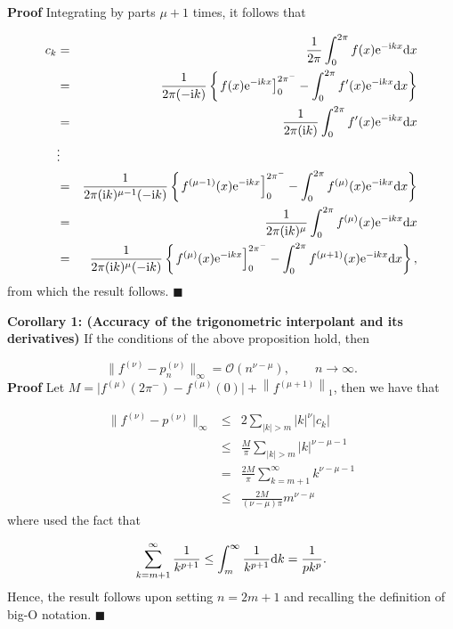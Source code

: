 \documentclass[12pt,landscape]{article}
\begin{document}
{\textbf{Proof} Integrating by parts $\mu+1$ times, it follows that


\begin{eqnarray*}
c_k &=& \frac{1}{2\pi}\int_{0}^{2\pi}f(x) {\rm e}^{-{\rm i}kx}{\rm d}x  \\
    &=& \frac{1}{2\pi(-{\rm i}k)}\left\lbrace \left.  f(x) {\rm e}^{-{\rm i}kx}\right]_{0}^{2\pi^{-}}  - \int_{0}^{2\pi}f'(x) {\rm e}^{-{\rm i}kx} {\rm d}x \right\rbrace \\
    &=& \frac{1}{2\pi({\rm i}k)} \int_{0}^{2\pi}f'(x) {\rm e}^{-{\rm i}kx} {\rm d}x \\
    &\vdots &   \\
    & = &  \frac{1}{2\pi({\rm i}k)^{\mu-1}(-{\rm i}k)}\left\lbrace \left.  f^{(\mu-1)}(x) {\rm e}^{-{\rm i}kx}\right]_{0}^{2\pi^{-}}  - \int_{0}^{2\pi}f^{(\mu)}(x) {\rm e}^{-{\rm i}kx} {\rm d}x \right\rbrace \\
    &=& \frac{1}{2\pi({\rm i}k)^{\mu}} \int_{0}^{2\pi}f^{(\mu)}(x) {\rm e}^{-{\rm i}kx} {\rm d}x \\
    &=& \frac{1}{2\pi({\rm i}k)^{\mu}(-{\rm i}k)}\left\lbrace \left.  f^{(\mu)}(x) {\rm e}^{-{\rm i}kx}\right]_{0}^{2\pi^{-}}  - \int_{0}^{2\pi}f^{(\mu+1)}(x) {\rm e}^{-{\rm i}kx} {\rm d}x \right\rbrace,
    \end{eqnarray*}
from which the result follows. $\blacksquare$

\textbf{Corollary 1: (Accuracy of the trigonometric interpolant and its derivatives)}  If the conditions of the above proposition hold, then

\[
\| f^{(\nu)} - p_n^{(\nu)} \|_{\infty} = \mathcal{O}(n^{\nu-\mu}), \qquad n \to \infty.
\]
\textbf{Proof} Let $M  = \vert f^{(\mu)}(2\pi^{-}) - f^{(\mu)}(0)   \vert + \left\|f^{(\mu+1)}   \right\|_1$, then we have that


\begin{eqnarray*}
\| f^{(\nu)} - p^{(\nu)}  \|_{\infty} & \leq  & 2\sum_{\vert k \vert > m} \vert k \vert^{\nu} \vert c_k \vert  \\
& \leq & \frac{M}{\pi } \sum_{\vert k \vert > m} \vert k \vert^{\nu-\mu-1} \\
& = & \frac{2M}{\pi } \sum_{ k = m+1}^{\infty}  k^{\nu-\mu-1} \\
& \leq & \frac{2M}{(\nu-\mu)\pi  } m^{\nu-\mu}
\end{eqnarray*}
where used the fact that

\[
\sum_{k = m+1}^{\infty}  \frac{1}{k^{p+1}}  \leq \int_{m}^{\infty} \frac{1}{k^{p+1}}{\rm d}k = \frac{1}{pk^p}.
\]
Hence, the result follows upon setting $n = 2m + 1$ and recalling the definition of big-O notation.   $\blacksquare$

}
\end{document}
